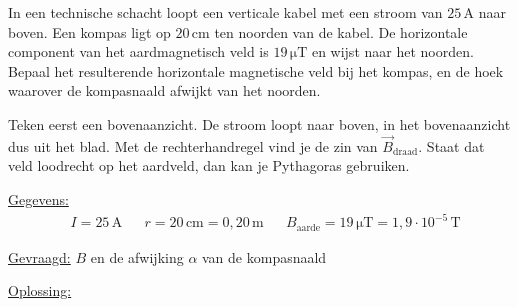 \documentclass{ximera}
\begin{document}
\begin{example}[foldable=true,title={Kompas naast een verticale stroomkabel}]\nl
    In een technische schacht loopt een verticale kabel met een stroom van $25\,\mathrm{A}$ naar boven. Een kompas ligt op $20\,\mathrm{cm}$ ten noorden van de kabel. De horizontale component van het aardmagnetisch veld is $19\,\mathrm{\mu T}$ en wijst naar het noorden.
    Bepaal het resulterende horizontale magnetische veld bij het kompas, en de hoek waarover de kompasnaald afwijkt van het noorden.

    \begin{remark}[title={Denkstap}]\nl
        Teken eerst een bovenaanzicht. De stroom loopt naar boven, in het bovenaanzicht dus uit het blad. Met de rechterhandregel vind je de zin van $\vec{B}_{\text{draad}}$. Staat dat veld loodrecht op het aardveld, dan kan je Pythagoras gebruiken.
    \end{remark}

    \begin{solution}\nl
        \underline{Gegevens:}
        \begin{align*}
            & I = 25\,\mathrm{A} & & r = 20\,\mathrm{cm} = 0{,}20\,\mathrm{m} & & B_{\text{aarde}} = 19\,\mathrm{\mu T} = 1{,}9 \cdot 10^{-5}\,\mathrm{T}
        \end{align*}

        \underline{Gevraagd:} $B$ en de afwijking $\alpha$ van de kompasnaald

        \underline{Oplossing:}

        \begin{center}
        \end{center}


\end{solution}
\end{example}
\end{document}
